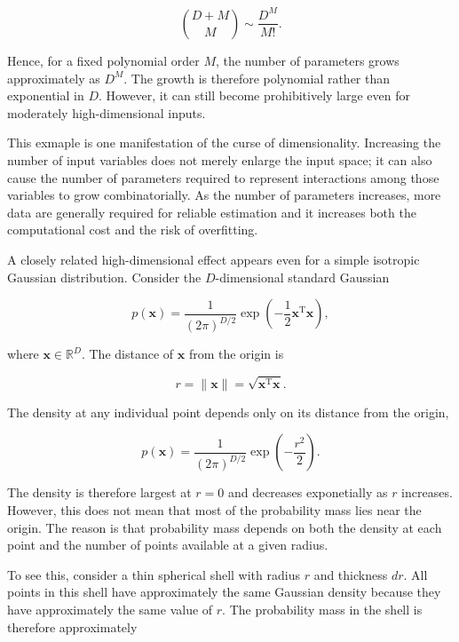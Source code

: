 \documentclass[10pt,twocolumn]{memoir}
\begin{document}
\begin{equation}
    \binom{D+M}{M} \sim \frac{D^M}{M!}.
\end{equation}

Hence, for a fixed polynomial order $M$, the number of parameters grows approximately as $D^M$. The growth is therefore polynomial rather than exponential in $D$. However, it can still become prohibitively large even for moderately high-dimensional inputs.

This exmaple is one manifestation of the curse of dimensionality. Increasing the number of input variables does not merely enlarge the input space; it can also cause the number of parameters required to represent interactions among those variables to grow combinatorially. As the number of parameters increases, more data are generally required for reliable estimation and it increases both the computational cost and the risk of overfitting.

A closely related high-dimensional effect appears even for a simple isotropic Gaussian distribution. Consider the $D$-dimensional standard Gaussian

\begin{equation}
    p(\mathbf{x}) = \frac{1}{(2\pi)^{D/2}}\exp\left(-\frac{1}{2}\mathbf{x}^{\mathrm{T}}\mathbf{x}\right),
\end{equation}

where $\mathbf{x}\in\mathbb{R}^D$. The distance of $\mathbf{x}$ from the origin is

\begin{equation}
    r = \|\mathbf{x}\| = \sqrt{\mathbf{x}^{\mathrm{T}}\mathbf{x}}.
\end{equation}

The density at any individual point depends only on its distance from the origin,

\begin{equation}
    p(\mathbf{x}) = \frac{1}{(2\pi)^{D/2}}\exp\left(-\frac{r^2}{2}\right).
\end{equation}

The density is therefore largest at $r=0$ and decreases exponetially as $r$ increases. However, this does not mean that most of the probability mass lies near the origin. The reason is that probability mass depends on both the density at each point and the number of points available at a given radius.

To see this, consider a thin spherical shell with radius $r$ and thickness $dr$. All points in this shell have approximately the same Gaussian density because they have approximately the same value of $r$. The probability mass in the shell is therefore approximately
\end{document}
